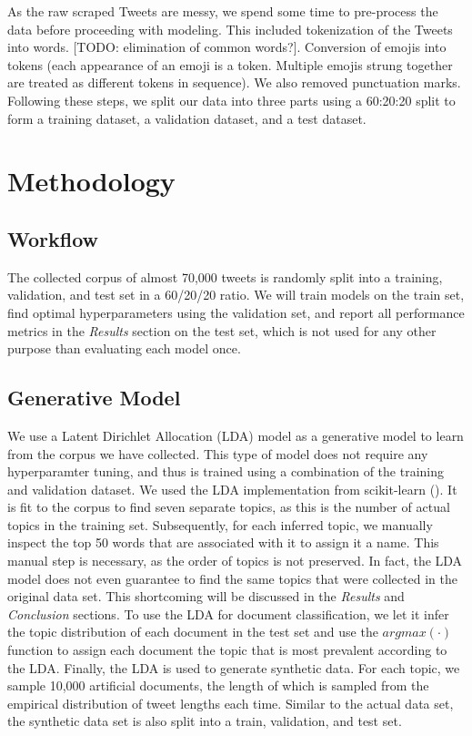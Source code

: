 \documentclass[11pt]{article}
\begin{document}
As the raw scraped Tweets are messy, we spend some time to pre-process the data before proceeding with modeling. This included tokenization of the Tweets into words. [TODO: elimination of common words?]. Conversion of emojis into tokens (each appearance of an emoji is a token. Multiple emojis strung together are treated as different tokens in sequence). We also removed punctuation marks. Following these steps, we split our data into three parts using a 60:20:20 split to form a training dataset, a validation dataset, and a test dataset. 


\noindent 




\section{Methodology}
\subsection{Workflow}
The collected corpus of almost 70,000 tweets is randomly split into a training, validation, and test set in a 60/20/20 ratio. We will train models on the train set, find optimal hyperparameters using the validation set, and report all performance metrics in the \emph{Results} section on the test set, which is not used for any other purpose than evaluating each model once. 


\subsection{Generative Model}
We use a Latent Dirichlet Allocation (LDA) model as a generative model to learn from the corpus we have collected. This type of model does not require any hyperparamter tuning, and thus is trained using a combination of the training and validation dataset. We used the LDA implementation from scikit-learn (\cite{sklearn}). It is fit to the corpus to find seven separate topics, as this is the number of actual topics in the training set. Subsequently, for each inferred topic, we manually inspect the top 50 words that are associated with it to assign it a name. This manual step is necessary, as the order of topics is not preserved. In fact, the LDA model does not even guarantee to find the same topics that were collected in the original data set. This shortcoming will be discussed in the \emph{Results} and \emph{Conclusion} sections. 
To use the LDA for document classification,  we let it infer the topic distribution of each document in the test set and use the $argmax(\cdot)$ function to assign each document the topic that is most prevalent according to the LDA.
Finally, the LDA is used to generate synthetic data. For each topic, we sample 10,000 artificial documents, the length of which is sampled from the empirical distribution of tweet lengths each time. Similar to the actual data set, the synthetic data set is also split into a train, validation, and test set.
\end{document}
